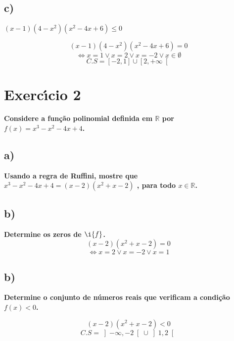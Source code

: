 \documentclass[a4paper]{article}
\begin{document}
	\subsection*{c)}\textbf{$\left(x-1\right)\left(4-x^2\right)\left(x^2-4x+6\right)\leq 0$}
	
	\[\left(x-1\right)\left(4-x^2\right)\left(x^2-4x+6\right)=0\]
	\[\Leftrightarrow x=1 \lor x=2 \lor x=-2 \lor x \in \emptyset \]
	\[C.S=\left[-2,1\right]\cup \left[2,+\infty\right[\]

	\section*{Exercı́cio 2}\textbf{Considere a função polinomial definida em $\mathbb{R}$ por $f(x) = x^3 - x^2 - 4x + 4$.}
	
	\subsection*{a)} \textbf{Usando a regra de Ruffini, mostre que $x^3 - x^2 - 4x + 4 = \left(x - 2\right) \left(x^2 + x - 2\right)$ , para todo $x \in \mathbb{R}$.}
	
	
	
	\subsection*{b)} \textbf{Determine os zeros de $\i{f}$.}
	\[\left(x - 2\right) \left(x^2 + x - 2\right)=0\]
	\[\Leftrightarrow x= 2 \lor x=-2 \lor x=1\]
	
	\subsection*{b)} \textbf{Determine o conjunto de números reais que verificam a condição $f(x)<0$.}
	
	
	\[\left(x - 2\right) \left(x^2 + x - 2\right)<0\]
	\[C.S=\left]-\infty,-2\right[\cup \left]1,2\right[\]
	
\end{document}
